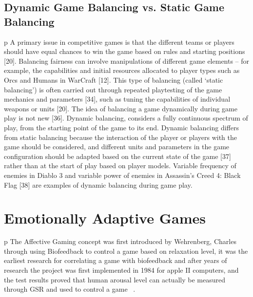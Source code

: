 \subsection{Dynamic Game Balancing vs. Static Game Balancing }
p A primary issue in competitive games is that the different teams or players should have equal chances to win the game based on rules and starting positions [20]. Balancing fairness can involve manipulations of different game elements – for example, the capabilities and initial resources allocated to player types such as Orcs and Humans in WarCraft [12]. This type of balancing (called ‘static balancing’) is often carried out through repeated playtesting of the game mechanics and parameters [34], such as tuning the capabilities of individual weapons or units [20].  The idea of balancing a game dynamically during game play is not new [36]. Dynamic balancing, considers a fully continuous spectrum of play, from the starting point of the game to its end. Dynamic balancing differs from static balancing because the interaction of the player or players with the game should be considered, and different units and parameters in the game configuration should be adapted based on the current state of the game [37] rather than at the start of play based on player models. Variable frequency of enemies in Diablo 3 and variable power of enemies in Assassin’s Creed 4: Black Flag [38] are examples of dynamic balancing during game play. 




\section{Emotionally Adaptive Games}


p The Affective Gaming concept was first introduced by Wehrenberg, Charles through using Biofeedback to control a game based on relaxation level, it was the earliest research for correlating a game with biofeedback and after years of research the project was first implemented in 1984 for apple II computers, and the test results proved that human arousal level can actually be measured through GSR and used to control a game  ~\cite{wehrenberg1995willball}.


